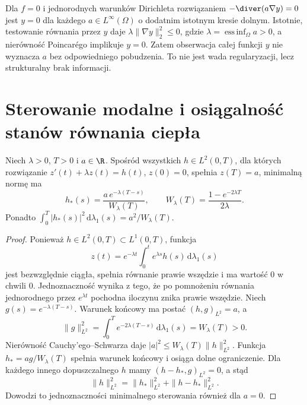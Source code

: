 \begin{kontrprzyklad}
Dla $f=0$ i jednorodnych warunków Dirichleta rozwiązaniem
$-\diver(a\nabla y)=0$ jest $y=0$ dla każdego
$a\in L^\infty(\Omega)$ o dodatnim istotnym kresie
dolnym. Istotnie, testowanie równania przez $y$
daje $\lambda\|\nabla y\|_2^2\le0$, gdzie
$\lambda=\operatorname*{ess\,inf}_\Omega a>0$,
a nierówność Poincarégo implikuje $y=0$.
Zatem obserwacja całej
funkcji $y$ nie wyznacza $a$ bez odpowiedniego pobudzenia.
To nie jest wada regularyzacji, lecz strukturalny brak informacji.
\end{kontrprzyklad}

\section{Sterowanie modalne i osiągalność stanów równania ciepła}
\begin{twierdzenie}
\label{thm:pde32-gramian}
Niech $\lambda>0$, $T>0$ i $a\in\R$. Spośród wszystkich
$h\in L^2(0,T)$, dla których rozwiązanie
$z'(t)+\lambda z(t)=h(t)$, $z(0)=0$, spełnia $z(T)=a$,
minimalną normę ma
\[
 h_*(s)=\frac{a\,e^{-\lambda(T-s)}}{W_\lambda(T)},
 \qquad W_\lambda(T)=\frac{1-e^{-2\lambda T}}{2\lambda}.
\]
Ponadto $\int_0^T|h_*(s)|^2\,\mathrm d\lambda_1(s)
=a^2/W_\lambda(T)$.
\end{twierdzenie}
\begin{proof}
Ponieważ $h\in L^2(0,T)\subset L^1(0,T)$,
funkcja
\[
 z(t)=e^{-\lambda t}\int_0^t e^{\lambda s}h(s)
 \,\mathrm d\lambda_1(s)
\]
jest bezwzględnie ciągła, spełnia równanie
prawie wszędzie i ma wartość $0$ w chwili $0$.
Jednoznaczność wynika z tego, że po pomnożeniu
równania jednorodnego przez $e^{\lambda t}$
pochodna iloczynu znika prawie wszędzie.
Niech $g(s)=e^{-\lambda(T-s)}$. Warunek końcowy
ma postać $(h,g)_{L^2}=a$, a
\[
 \|g\|_{L^2}^2
 =\int_0^T e^{-2\lambda(T-s)}\,\mathrm d\lambda_1(s)
 =W_\lambda(T)>0.
\]
Nierówność Cauchy'ego--Schwarza daje
$|a|^2\le W_\lambda(T)\|h\|_{L^2}^2$.
Funkcja $h_*=ag/W_\lambda(T)$ spełnia warunek
końcowy i osiąga dolne ograniczenie.
Dla każdego innego dopuszczalnego $h$ mamy
$(h-h_*,g)_{L^2}=0$, a stąd
\[
 \|h\|_{L^2}^2
 =\|h_*\|_{L^2}^2+\|h-h_*\|_{L^2}^2.
\]
Dowodzi to jednoznaczności minimalnego sterowania
również dla $a=0$.
\end{proof}

